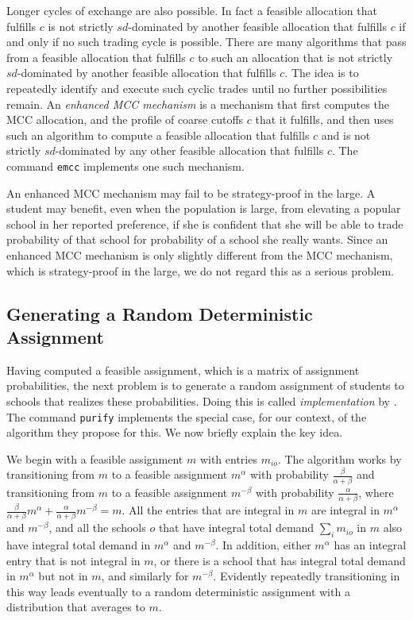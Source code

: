 \documentclass[12pt]{article}
\theoremstyle{definition}
\begin{document}
Longer cycles of exchange are also possible.  In fact a feasible
allocation that fulfills $c$ is not strictly $sd$-dominated by another
feasible allocation that fulfills $c$ if and only if no such trading
cycle is possible.  There are many algorithms that pass from a
feasible allocation that fulfills $c$ to such an allocation that is
not strictly $sd$-dominated by another feasible allocation that
fulfills $c$.  The idea is to repeatedly identify and execute such
cyclic trades until no further possibilities remain.  An
\emph{enhanced MCC mechanism} is a mechanism that first computes the
MCC allocation, and the profile of coarse cutoffs $c$ that it
fulfills, and then uses such an algorithm to compute a feasible
allocation that fulfills $c$ and is not strictly $sd$-dominated by any
other feasible allocation that fulfills $c$.  The command
\texttt{emcc} implements one such mechanism.

An enhanced MCC mechanism may fail to be strategy-proof in the large.
A student may benefit, even when the population is large, from elevating
a popular school in her reported preference, if she is confident that
she will be able to trade probability of that school for probability
of a school she really wants.  Since an enhanced MCC mechanism is only
slightly different from the MCC mechanism, which is strategy-proof in
the large, we do not regard this as a serious problem.

\subsection{Generating a Random Deterministic Assignment}

Having computed a feasible assignment, which is a matrix of
assignment probabilities, the next problem is to generate a
random assignment of students to schools that realizes these
probabilities.  Doing this is called \emph{implementation} by
\cite{bckm13aer}.  The command \texttt{purify} implements the special
case, for our context, of the algorithm they propose for this.  We now
briefly explain the key idea.

We begin with a feasible assignment $m$ with entries $m_{io}$.  The
algorithm works by transitioning from $m$ to a feasible assignment
$m^\alpha$ with probability $\tfrac{\beta}{\alpha + \beta}$ and
transitioning from $m$ to a feasible assignment $m^{-\beta}$ with
probability $\tfrac{\alpha}{\alpha + \beta}$, where
$\tfrac{\beta}{\alpha + \beta}m^\alpha + \tfrac{\alpha}{\alpha +
  \beta}m^{-\beta} = m$.  All the entries that are integral in $m$ are
integral in $m^\alpha$ and $m^{-\beta}$, and all the schools $o$ that
have integral total demand $\sum_i m_{io}$ in $m$ also have integral
total demand in $m^\alpha$ and $m^{-\beta}$.  In addition, either
$m^\alpha$ has an integral entry that is not integral in $m$, or there
is a school that has integral total demand in $m^\alpha$ but not in
$m$, and similarly for $m^{-\beta}$.  Evidently repeatedly
transitioning in this way leads eventually to a random deterministic
assignment with a distribution that averages to $m$.
\end{document}

